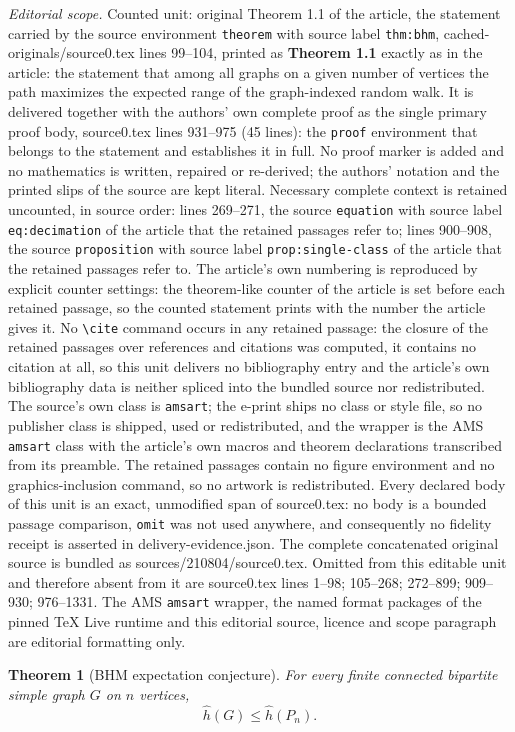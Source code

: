 \documentclass[10pt,a4paper]{amsart}
\newtheorem{theorem}{Theorem}[section]
\theoremstyle{remark}
\numberwithin{equation}{section}
\begin{document}
\noindent\textit{Editorial scope.} Counted unit: original Theorem 1.1 of the article, the statement carried by the source environment \texttt{theorem} with source label \texttt{thm:bhm}, cached-originals/source0.tex lines 99--104, printed as \textbf{Theorem 1.1} exactly as in the article: the statement that among all graphs on a given number of vertices the path maximizes the expected range of the graph-indexed random walk. It is delivered together with the authors' own complete proof as the single primary proof body, source0.tex lines 931--975 (45 lines): the \texttt{proof} environment that belongs to the statement and establishes it in full. No proof marker is added and no mathematics is written, repaired or re-derived; the authors' notation and the printed slips of the source are kept literal. Necessary complete context is retained uncounted, in source order: lines 269--271, the source \texttt{equation} with source label \texttt{eq:decimation} of the article that the retained passages refer to; lines 900--908, the source \texttt{proposition} with source label \texttt{prop:single-class} of the article that the retained passages refer to. The article's own numbering is reproduced by explicit counter settings: the theorem-like counter of the article is set before each retained passage, so the counted statement prints with the number the article gives it. No \texttt{\textbackslash cite} command occurs in any retained passage: the closure of the retained passages over references and citations was computed, it contains no citation at all, so this unit delivers no bibliography entry and the article's own bibliography data is neither spliced into the bundled source nor redistributed. The source's own class is \texttt{amsart}; the e-print ships no class or style file, so no publisher class is shipped, used or redistributed, and the wrapper is the AMS \texttt{amsart} class with the article's own macros and theorem declarations transcribed from its preamble. The retained passages contain no figure environment and no graphics-inclusion command, so no artwork is redistributed. Every declared body of this unit is an exact, unmodified span of source0.tex: no body is a bounded passage comparison, \texttt{omit} was not used anywhere, and consequently no fidelity receipt is asserted in delivery-evidence.json. The complete concatenated original source is bundled as sources/210804/source0.tex. Omitted from this editable unit and therefore absent from it are source0.tex lines 1--98; 105--268; 272--899; 909--930; 976--1331. The AMS \texttt{amsart} wrapper, the named format packages of the pinned TeX Live runtime and this editorial source, licence and scope paragraph are editorial formatting only.\par\smallskip
\setcounter{section}{1}
\setcounter{equation}{0}
\setcounter{theorem}{0}
\begin{theorem}[BHM expectation conjecture]\label{thm:bhm}
For every finite connected bipartite simple graph $G$ on $n$ vertices,
\begin{equation}\label{eq:bhm}
 \widehat h(G)\le\widehat h(P_n).
\end{equation}
\end{theorem}
\end{document}
